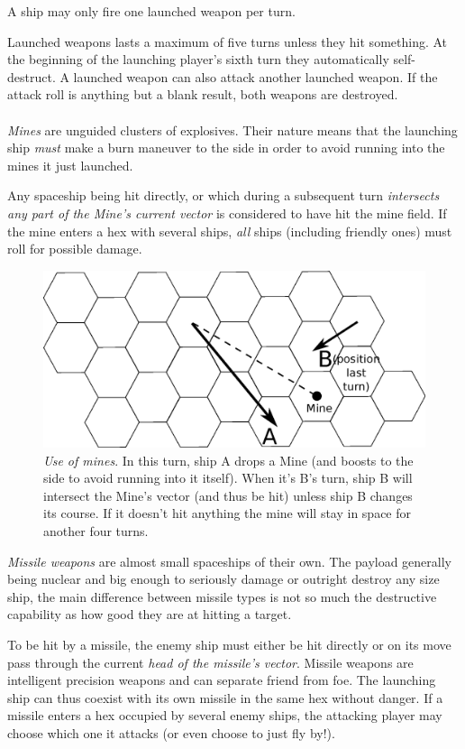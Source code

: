 \documentclass[a4paper,12pt,notitlepage,twocolumn]{article}
\begin{document}
A ship may only fire one launched weapon per turn. 

Launched weapons lasts a maximum of five turns unless they hit something. 
At the beginning of the launching player's sixth turn they
automatically self-destruct. A launched weapon can also attack another
launched weapon. If the attack roll is anything but a blank result,
both weapons are destroyed. 
\\\\
\emph{Mines} are unguided clusters of explosives. Their nature
means that the launching ship \emph{must} make a burn maneuver to the
side in order to avoid running into the mines it just launched. 

Any spaceship being hit directly, or which during a subsequent turn
\emph{intersects any part of the Mine's current vector} is considered to
have hit the mine field. If the mine enters a hex with several ships,
\emph{all} ships (including friendly ones) must roll for possible
damage.     

\begin{figure}[h!]\centering 
  \includegraphics[width=0.5 \textwidth]{data/combat_1.eps}
  \caption{\footnotesize \emph{Use of mines}. In this turn,
    ship A drops a Mine (and boosts to the side to avoid 
    running into it itself). When it's B's turn, ship B will
    intersect the Mine's vector (and thus be hit) unless ship B
    changes its course. If it doesn't hit anything the mine will stay
    in space for another four turns.}
\label{fig:10}
\end{figure}

\emph{Missile weapons} are almost small spaceships of their own. The
payload generally being nuclear and big enough to seriously damage or outright
destroy any size ship, the main difference between missile types is
not so much the destructive capability as how good they are at 
hitting a target. 

To be hit by a missile, the enemy ship must either
be hit directly or on its move pass through the current \emph{head of the
missile's vector}. Missile weapons are intelligent
precision weapons and can separate friend from foe. The launching ship
can thus coexist with its own missile in the same hex without danger. If a missile
enters a hex occupied by several enemy ships, the attacking player may
choose which one it attacks (or even choose to just fly by!). 
\end{document}
